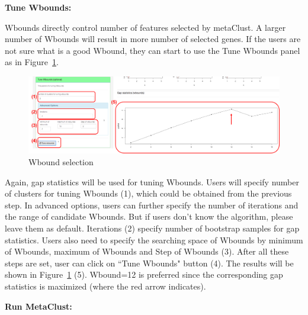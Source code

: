 \begin{steps}
\item \textbf{Tune Wbounds:} 

Wbounds directly control number of features selected by metaClust.
A larger number of Wbounds will result in more number of selected genes.
If the users are not sure what is a good Wbound,
they can start to use the Tune Wbounds panel as in Figure~\ref{fig:metaClusttuneW}.
\begin{figure}[H]
\begin{center}
\includegraphics[scale=0.5]{./figure/metaClust/tuneW.pdf}
\caption{Wbound selection}
\label{fig:metaClusttuneW}
\end{center}
\end{figure}
Again,
gap statistics will be used for tuning Wbounds.
Users will specify number of clusters for tuning Wbounds {\color{red} (1)}, which could be obtained from the previous step.
In advanced options, users can further specify the number of iterations and the range of candidate Wbounds.
But if users don't know the algorithm, please leave them as default.
Iterations {\color{red} (2)} specify number of bootstrap samples for gap statistics.
Users also need to specify the searching space of Wbounds by minimum of Wbounds, maximum of Wbounds and Step of Wbounds {\color{red} (3)}.
After all these steps are set,
user can click on ``Tune Wbounds" button {\color{red} (4)}.
The results will be shown in Figure~\ref{fig:metaClusttuneW} {\color{red} (5)}.
Wbound=12 is preferred since the corresponding gap statistics is maximized (where the red arrow indicates).

\item \textbf{Run MetaClust:} 


\end{steps}
